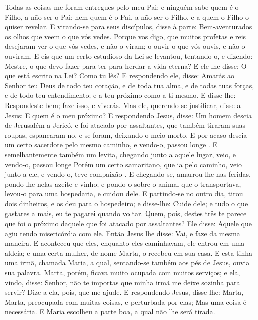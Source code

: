 {  Todas as coisas me foram entregues pelo meu Pai; e ninguém sabe quem é o Filho, a não ser o Pai; nem quem é o Pai, a não ser o Filho, e a quem o Filho o quiser revelar.
  E virando-se para seus discípulos, disse
{} à parte: Bem-aventurados os olhos que veem o que vós vedes.
  Porque vos digo, que muitos profetas e reis desejaram ver o que vós vedes, e não o viram; o ouvir o que vós ouvis, e não o ouviram.
  E eis que um certo estudioso da Lei se levantou, tentando-o, e dizendo: Mestre, o que devo fazer para ter para herdar a vida eterna?
  E ele lhe disse: O que está escrito na Lei? Como tu
{} lês?
  E respondendo ele, disse: Amarás ao Senhor teu Deus de todo teu coração, e de toda tua alma, e de todas tuas forças, e de todo teu entendimento; e
{} a teu próximo como a ti mesmo.
  E disse-lhe: Respondeste bem; faze isso, e viverás.
  Mas ele, querendo se justificar, disse a Jesus: E quem é o meu próximo?
  E respondendo Jesus, disse: Um homem descia de Jerusalém a Jericó, e foi atacado por assaltantes, que também tiraram suas roupas, espancaram-no, e se foram, deixando-o meio morto.
  E por acaso descia um certo sacerdote pelo mesmo caminho, e vendo-o, passou longe
{} .
  E semelhantemente também um levita, chegando junto a aquele lugar, veio, e vendo-o, passou longe
{}
  Porém um certo samaritano, que ia pelo caminho, veio junto a ele, e vendo-o, teve compaixão
{} .
  E chegando-se, amarrou-lhe
{} nas feridas, pondo-lhe nelas azeite e vinho; e pondo-o sobre o animal que o transportava, levou-o para uma hospedaria, e cuidou dele.
  E partindo-se no outro dia, tirou dois dinheiros, e os deu para o hospedeiro; e disse-lhe: Cuide dele; e tudo o que gastares a mais, eu te pagarei quando voltar.
  Quem, pois, destes três te parece que foi o próximo daquele que foi atacado por assaltantes?
  Ele disse: Aquele que agiu tendo misericórdia com ele. Então Jesus lhe disse: Vai, e faze da mesma maneira.
  E aconteceu que eles, enquanto eles caminhavam, ele entrou em uma aldeia; e uma certa mulher, de nome Marta, o recebeu em sua casa.
  E esta tinha uma irmã, chamada Maria, a qual, sentando-se também aos pés de Jesus, ouvia sua palavra.
  Marta, porém, ficava muito ocupada com muitos serviços; e ela, vindo, disse: Senhor, não te importas que minha irmã me deixe sozinha para servir? Dize a ela, pois, que me ajude.
  E respondendo Jesus, disse-lhe: Marta, Marta,
{} preocupada com muitas coisas, e perturbada por elas;
  Mas
{} uma coisa é necessária. E Maria escolheu a parte boa, a qual não lhe será tirada.
\par }

